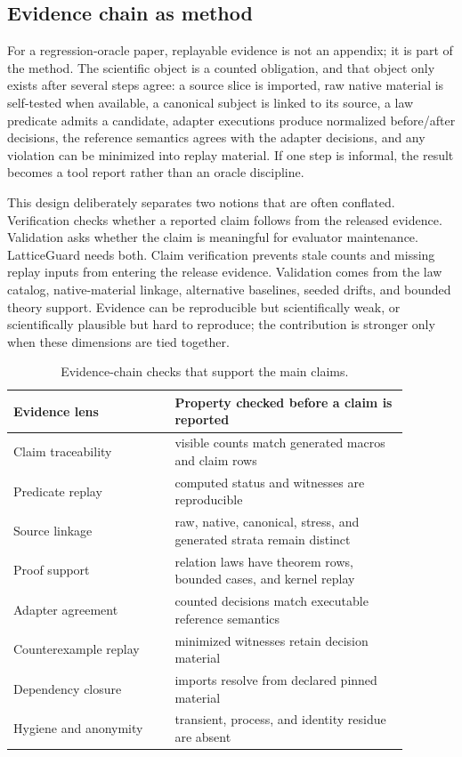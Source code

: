 \documentclass[10pt,conference]{IEEEtran}
\begin{document}
\subsection{Evidence chain as method}
For a regression-oracle paper, replayable evidence is not an appendix; it is part of the method.  The scientific object is a counted obligation, and that object only exists after several steps agree: a source slice is imported, raw native material is self-tested when available, a canonical subject is linked to its source, a law predicate admits a candidate, adapter executions produce normalized before/after decisions, the reference semantics agrees with the adapter decisions, and any violation can be minimized into replay material.  If one step is informal, the result becomes a tool report rather than an oracle discipline.

This design deliberately separates two notions that are often conflated.  Verification checks whether a reported claim follows from the released evidence.  Validation asks whether the claim is meaningful for evaluator maintenance.  LatticeGuard needs both.  Claim verification prevents stale counts and missing replay inputs from entering the release evidence.  Validation comes from the law catalog, native-material linkage, alternative baselines, seeded drifts, and bounded theory support.  Evidence can be reproducible but scientifically weak, or scientifically plausible but hard to reproduce; the contribution is stronger only when these dimensions are tied together.

\begin{table}[t]
\centering
\caption{Evidence-chain checks that support the main claims.}
\label{tab:evidencechain}
\begin{tabular}{p{0.36\linewidth}p{0.52\linewidth}}
\toprule
Evidence lens & Property checked before a claim is reported \\
\midrule
Claim traceability & visible counts match generated macros and claim rows \\
Predicate replay & computed status and witnesses are reproducible \\
Source linkage & raw, native, canonical, stress, and generated strata remain distinct \\
Proof support & relation laws have theorem rows, bounded cases, and kernel replay \\
Adapter agreement & counted decisions match executable reference semantics \\
Counterexample replay & minimized witnesses retain decision material \\
Dependency closure & imports resolve from declared pinned material \\
Hygiene and anonymity & transient, process, and identity residue are absent \\
\bottomrule
\end{tabular}
\end{table}
\end{document}
